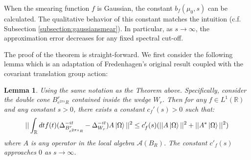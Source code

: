 \documentclass[a4paper,11pt]{article}
\newtheorem{lemma}[theorem]{Lemma}
\theoremstyle{definition}
\begin{document}
When the smearing function $f$ is Gaussian, the constant $b_f(\mu_0, s)$ can be calculated. The qualitative behavior of this constant matches the intuition (c.f. Subsection \ref{subsection:gaussiansmear}). In particular, as $s\rightarrow\infty$, the approximation error decreases for any fixed spectral cut-off. 

The proof of the theorem is straight-forward. We first consider the following lemma which is an adaptation of Fredenhagen's original result \cite{fredenhagen} coupled with the covariant translation group action:
\begin{lemma}\label{lemma:extensionfredenhagen}
    Using the same notation as the Theorem above. Specifically, consider the double cone $B^r_{e^{2\pi s}R}$ contained inside the wedge $W_r$. Then for any $f\in L^1(\mathbb{R})$ and any constant $s > 0$, there exists a constant $c_f'(s) > 0$ such that:
    \begin{equation}
        ||\int_\mathbb{R} dt f(t) (\Delta^{-it}_{B^r_{e^{2\pi s}R}} - \Delta_{W_r}^{-it})A\ket{\Omega}||^2 \leq c'_f(s)(||A\ket{\Omega}||^2 + ||A^*\ket{\Omega}||^2)
    \end{equation}
    where $A$ is any operator in the local algebra $\mathcal{A}(B_R)$. The constant $c'_f(s)$ approaches $0$ as $s\rightarrow \infty$.
\end{lemma}
\end{document}
